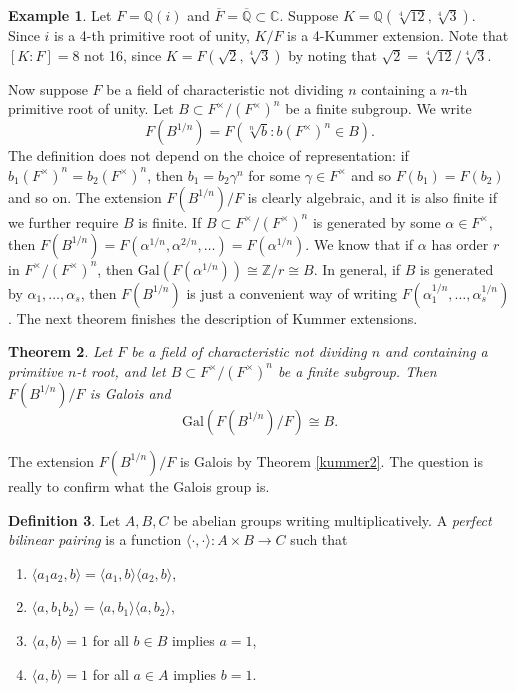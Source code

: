 \documentclass[12pt]{report}
\newtheorem{theorem}{Theorem}[section]
\theoremstyle{definition}
\newtheorem{definition}[theorem]{Definition}
\newtheorem{example}[theorem]{Example}
\newcommand{\gal}{\text{Gal}}
\newcommand{\cc}{\mathbb{C}}
\newcommand{\zz}{\mathbb{Z}}
\newcommand{\ta}[1]{\langle #1 \rangle}
\newcommand{\qq}{\mathbb{Q}}
\begin{document}
\begin{example}
	Let $F=\qq(i)$ and $\overline{F}=\overline{\qq}\subset \cc$. Suppose $K=\qq(\sqrt[4]{12},\sqrt[4]{3})$. Since $i$ is a 4-th primitive root of unity, $K/F$ is a 4-Kummer extension. Note that $[K:F]=8$ not 16, since $K=F(\sqrt{2},\sqrt[4]{3})$ by noting that $\sqrt{2}=\sqrt[4]{12}/\sqrt[4]{3}$.
\end{example}

Now suppose $F$ be a field of characteristic not dividing $n$ containing a $n$-th primitive root of unity. Let $B\subset F^\times/(F^{\times})^{n}$ be a finite subgroup. We write \[F(B^{1/n})=F(\sqrt[n]{b}: b(F^\times)^n\in B).\]
The definition does not depend on the choice of representation: if $b_1(F^\times)^n=b_2(F^\times)^n$, then $b_1=b_2\gamma^n$ for some $\gamma\in F^\times$ and so $F(b_1)=F(b_2)$ and so on. The extension $F(B^{1/n})/F$ is clearly algebraic, and it is also finite if we further require $B$ is finite. If $B\subset F^\times/(F^{\times})^{n}$ is generated by some $\alpha\in F^\times$, then $F(B^{1/n})=F(\alpha^{1/n},\alpha^{2/n},\dots)=F(\alpha^{1/n})$. We know that if $\alpha$ has order $r$ in $F^\times/(F^{\times})^{n}$, then $\gal(F(\alpha^{1/n}))\cong \zz/r\cong B$. In general, if $B$ is generated by $\alpha_1,\dots,\alpha_s$, then $F(B^{1/n})$ is just a convenient way of writing $F(\alpha_1^{1/n},\dots,\alpha_s^{1/n})$. The next theorem finishes the description of Kummer extensions.

\begin{theorem}\label{kummer3}
	Let $F$ be a field of characteristic not dividing $n$ and containing a primitive $n$-t root, and let $B\subset F^\times/(F^{\times})^{n}$ be a finite subgroup. Then $F(B^{1/n})/F$ is Galois and $$\gal(F(B^{1/n})/F)\cong B.$$
\end{theorem}

The extension $F(B^{1/n})/F$ is Galois by Theorem \ref{kummer2}. The question is really to confirm what the Galois group is.

\begin{definition}
	Let $A,B,C$ be abelian groups writing multiplicatively. A \emph{perfect bilinear pairing} is a function $\langle \cdot,\cdot\rangle: A\times B\to C$ such that
	\begin{enumerate}
		\item $\ta{a_1a_2,b}=\ta{a_1,b}\ta{a_2,b}$,
		\item $\ta{a,b_1b_2}=\ta{a,b_1}\ta{a,b_2}$,
		\item $\ta{a,b}=1$ for all $b\in B$ implies $a=1$,
		\item $\ta{a,b}=1$ for all $a\in A$ implies $b=1$.
	\end{enumerate}
\end{definition}
\end{document}
